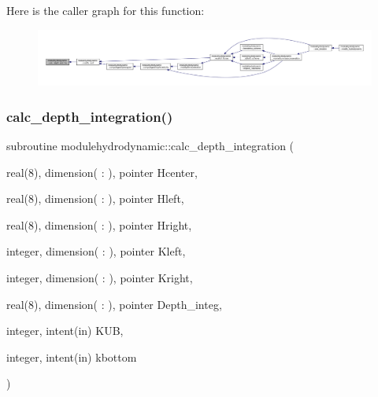 Here is the caller graph for this function\+:\nopagebreak
\begin{figure}[H]
\begin{center}
\leavevmode
\includegraphics[width=350pt]{namespacemodulehydrodynamic_a3795523d3d6ec72b6a33735c32624ff2_icgraph}
\end{center}
\end{figure}
\mbox{\label{namespacemodulehydrodynamic_a6026ae01a3e1aa6a649387589a05431c}} 
\subsubsection{\texorpdfstring{calc\+\_\+depth\+\_\+integration()}{calc\_depth\_integration()}}
{\footnotesize\ttfamily subroutine modulehydrodynamic\+::calc\+\_\+depth\+\_\+integration (\begin{DoxyParamCaption}\item[{real(8), dimension( \+: ), pointer}]{Hcenter,  }\item[{real(8), dimension( \+: ), pointer}]{Hleft,  }\item[{real(8), dimension( \+: ), pointer}]{Hright,  }\item[{integer, dimension( \+: ), pointer}]{Kleft,  }\item[{integer, dimension( \+: ), pointer}]{Kright,  }\item[{real(8), dimension( \+: ), pointer}]{Depth\+\_\+integ,  }\item[{integer, intent(in)}]{K\+UB,  }\item[{integer, intent(in)}]{kbottom }\end{DoxyParamCaption})\hspace{0.3cm}{\ttfamily [private]}}

